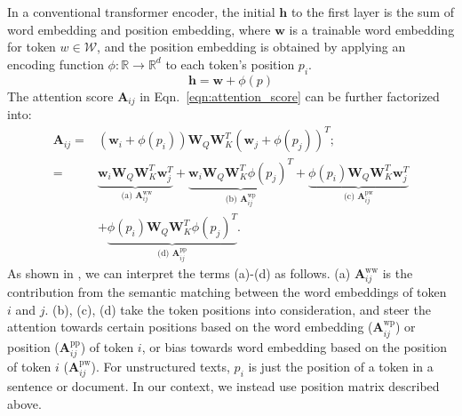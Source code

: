 \documentclass[sigconf, nonacm]{acmart}
\newcommand{\nop}[1]{}
\begin{document}
In a conventional transformer encoder, the initial $\mathbf{h}$ to the first layer is the sum of word embedding and position embedding, where $\mathbf{w}$ is a trainable word embedding for token $w \in \mathcal{W}$, and the position embedding is obtained by applying an encoding function $\phi: \mathbb{R} \rightarrow \mathbb{R}^{d}$ to each token's position $p_i$. 
\begin{equation}
    \mathbf{h}=\mathbf{w}+\phi(p)
\end{equation}
The attention score $\boldsymbol{A}_{i j}$ in Eqn.~\ref{eqn:attention_score} can be further factorized into:
\begin{equation}
{
\begin{aligned}
\boldsymbol{A}_{i j}=& (\mathbf{w}_{i}+\phi(p_i)) \boldsymbol{W}_{Q}\boldsymbol{W}_{K}^{T}(\mathbf{w}_{j}+\phi(p_j))^{T};\\
=& \underbrace{\mathbf{w}_{i} \boldsymbol{W}_{Q} \boldsymbol{W}_{K}^{T} \mathbf{w}_{j}^{T}}_{
\text { (a) } \boldsymbol{A}_{i j}^{\mathrm{ww}}
}+\underbrace{\mathbf{w}_{i} \boldsymbol{W}_{Q} \boldsymbol{W}_{K}^{T} \phi\left(p_{j}\right)^{T}}_{\text {(b) } \boldsymbol{A}_{i j}^{\mathrm{wp}}}+\underbrace{\phi\left(p_{i}\right) \boldsymbol{W}_{Q} \boldsymbol{W}_{K}^{T} \mathbf{w}_{j}^{T}}_{\text {(c) } \boldsymbol{A}_{i j}^{\mathrm{pw}}}\\
& +\underbrace{\phi\left(p_{i}\right) \boldsymbol{W}_{Q} \boldsymbol{W}_{K}^{T} \phi\left(p_{j}\right)^{T}}_{\text {(d) } \boldsymbol{A}_{i j}^{\mathrm{pp}}}.
\end{aligned}}
\end{equation}
As shown in \citet{zuegner_code_transformer_2021}, we can interpret the terms (a)-(d) as follows. (a) $\boldsymbol{A}_{i j}^{\mathrm{ww}}$ is the contribution from the semantic matching between the word embeddings of token $i$ and $j$. (b), (c), (d) take the token positions into consideration, and steer the attention towards certain positions based on the word embedding ($\boldsymbol{A}_{i j}^{\mathrm{wp}}$) or position ($\boldsymbol{A}_{i j}^{\mathrm{pp}}$) of token $i$, or bias towards word embedding based on the position of token $i$ ($\boldsymbol{A}_{i j}^{\mathrm{pw}}$). For unstructured texts, $p_i$ is just the position of a token in a sentence or document. In our context, we instead use position matrix described above.

\nop{I think the paragraphs above are all talking about the internals of BERT, right from Sec 4.2.2, which is not part of our contribution. So, the reader may be left wondering why she is shown all the details until they arrive at the following paragraph, which is brief. So, I suggest starting with a brief introduction of key parts of BERT and motivating what and why you plan to replace with novel components that are suited for the HTML setting. Provide intuition before introducing the concept.}
\end{document}
